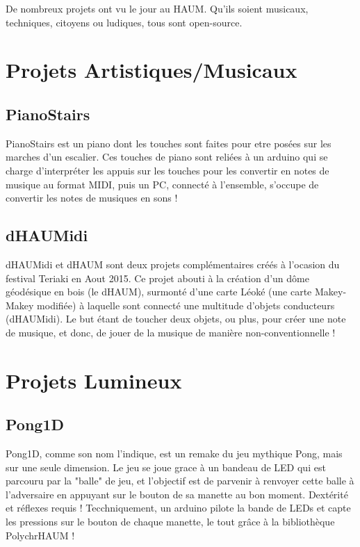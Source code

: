 De nombreux projets ont vu le jour au HAUM. Qu'ils soient musicaux, techniques, citoyens ou ludiques, tous sont open-source.

\section{Projets Artistiques/Musicaux}

\subsection{PianoStairs}
PianoStairs est un piano dont les touches sont faites pour etre posées sur les marches d'un escalier. Ces touches de piano sont reliées à un arduino qui se charge d'interpréter les appuis sur les touches pour les convertir en notes de musique au format MIDI, puis un PC, connecté à l'ensemble, s'occupe de convertir les notes de musiques en sons !

\subsection{dHAUMidi}
dHAUMidi et dHAUM sont deux projets complémentaires créés à l'ocasion du festival Teriaki en Aout 2015. Ce projet abouti à la création d'un dôme géodésique en bois (le dHAUM), surmonté d'une carte Léoké (une carte Makey-Makey modifiée) à laquelle sont connecté une multitude d'objets conducteurs (dHAUMidi). Le but étant de toucher deux objets, ou plus, pour créer une note de musique, et donc, de jouer de la musique de manière non-conventionnelle !


\section{Projets Lumineux}


\subsection{Pong1D}
Pong1D, comme son nom l'indique, est un remake du jeu mythique Pong, mais sur une seule dimension. Le jeu se joue grace à un bandeau de LED qui est parcouru par la "balle" de jeu, et l'objectif est de parvenir à renvoyer cette balle à l'adversaire en appuyant sur le bouton de sa manette au bon moment. Dextérité et réflexes requis ! Tecchniquement, un arduino pilote la bande de LEDs et capte les pressions sur le bouton de chaque manette, le tout grâce à la bibliothèque PolychrHAUM !


